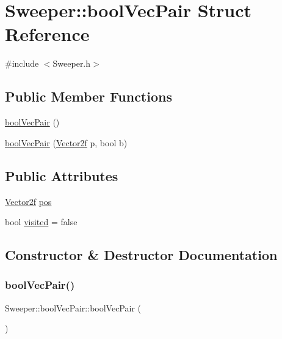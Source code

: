 \hypertarget{struct_sweeper_1_1bool_vec_pair}{}\section{Sweeper\+::bool\+Vec\+Pair Struct Reference}
\label{struct_sweeper_1_1bool_vec_pair}


{\ttfamily \#include $<$Sweeper.\+h$>$}

\subsection*{Public Member Functions}
\begin{DoxyCompactItemize}
\item 
\mbox{\hyperlink{struct_sweeper_1_1bool_vec_pair_a49e55314836f7ace0da9571c5812e335}{bool\+Vec\+Pair}} ()
\item 
\mbox{\hyperlink{struct_sweeper_1_1bool_vec_pair_a8e9d3b719a0671275d8413144df07249}{bool\+Vec\+Pair}} (\mbox{\hyperlink{class_vector2f}{Vector2f}} p, bool b)
\end{DoxyCompactItemize}
\subsection*{Public Attributes}
\begin{DoxyCompactItemize}
\item 
\mbox{\hyperlink{class_vector2f}{Vector2f}} \mbox{\hyperlink{struct_sweeper_1_1bool_vec_pair_a8234a943d954b313a5f5fdf30cd65d29}{pos}}
\item 
bool \mbox{\hyperlink{struct_sweeper_1_1bool_vec_pair_a9ef5a79d1980954fe48dfc41e6c8a68f}{visited}} = false
\end{DoxyCompactItemize}


\subsection{Constructor \& Destructor Documentation}
\mbox{\label{struct_sweeper_1_1bool_vec_pair_a49e55314836f7ace0da9571c5812e335}} 
\subsubsection{\texorpdfstring{boolVecPair()}{boolVecPair()}\hspace{0.1cm}{\footnotesize\ttfamily [1/2]}}
{\footnotesize\ttfamily Sweeper\+::bool\+Vec\+Pair\+::bool\+Vec\+Pair (\begin{DoxyParamCaption}{ }\end{DoxyParamCaption})\hspace{0.3cm}{\ttfamily [inline]}}

